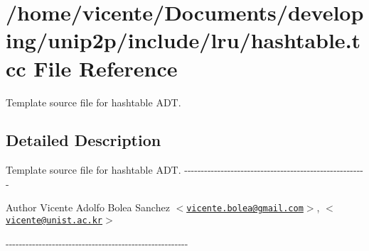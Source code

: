 \hypertarget{hashtable_8tcc}{\section{/home/vicente/\-Documents/developing/unip2p/include/lru/hashtable.tcc \-File \-Reference}
\label{hashtable_8tcc}
}


\-Template source file for hashtable \-A\-D\-T.  




\subsection{\-Detailed \-Description}
\-Template source file for hashtable \-A\-D\-T. -\/-\/-\/-\/-\/-\/-\/-\/-\/-\/-\/-\/-\/-\/-\/-\/-\/-\/-\/-\/-\/-\/-\/-\/-\/-\/-\/-\/-\/-\/-\/-\/-\/-\/-\/-\/-\/-\/-\/-\/-\/-\/-\/-\/-\/-\/-\/-\/-\/-\/-\/-\/-\/-\/-\/ \begin{DoxyAuthor}{\-Author}
\-Vicente \-Adolfo \-Bolea \-Sanchez $<$\href{mailto:vicente.bolea@gmail.com}{\tt vicente.\-bolea@gmail.\-com}$>$, $<$\href{mailto:vicente@unist.ac.kr}{\tt vicente@unist.\-ac.\-kr}$>$
\end{DoxyAuthor}
-\/-\/-\/-\/-\/-\/-\/-\/-\/-\/-\/-\/-\/-\/-\/-\/-\/-\/-\/-\/-\/-\/-\/-\/-\/-\/-\/-\/-\/-\/-\/-\/-\/-\/-\/-\/-\/-\/-\/-\/-\/-\/-\/-\/-\/-\/-\/-\/-\/-\/-\/-\/-\/-\/-\/ 
